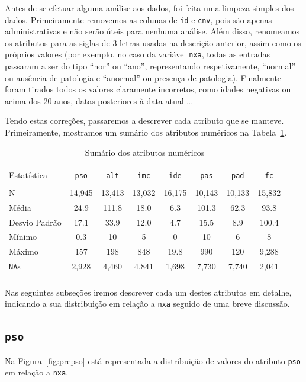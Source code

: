 \documentclass[10pt, conference, compsocconf]{IEEEtran}
\begin{document}
Antes de se efetuar alguma análise aos dados, foi feita uma limpeza
simples dos dados. Primeiramente removemos as colunas de {\tt id} e
{\tt cnv}, pois são apenas administrativas e não serão úteis para
nenhuma análise. Além disso, renomeamos os atributos para as siglas de
3 letras usadas na descrição anterior, assim como os próprios valores
(por exemplo, no caso da variável {\tt nxa}, todas as entradas
passaram a ser do tipo ``nor'' ou ``ano'', representando
respetivamente, ``normal'' ou ausência de patologia e ``anormal'' ou
presença de patologia). Finalmente foram tirados todos os valores
claramente incorretos, como idades negativas ou acima dos 20 anos,
datas posteriores à data atual \ldots

Tendo estas correções, passaremos a descrever cada atributo que se
manteve. Primeiramente, mostramos um sumário dos atributos numéricos
na Tabela~\ref{tab:nua}.

\begin{table}[!ht] \centering 
  \caption{Sumário dos atributos numéricos}
  \label{tab:nua} 
  \begin{tabular}{@{\extracolsep{5pt}}lccccccc} 
    \\[-1.8ex]\hline 
    \hline \\[-1.8ex] 
    Estatística & {\tt pso} & {\tt alt} & {\tt imc} & {\tt ide} & {\tt pas} & {\tt pad} & {\tt fc} \\ 
    \hline \\[-1.8ex] 
    N & 14,945 & 13,413 & 13,032 & 16,175 & 10,143 & 10,133 & 15,832 \\ 
    Média & 24.9 & 111.8 & 18.0 & 6.3 & 101.3 & 62.3 & 93.8 \\ 
    Desvio Padrão & 17.1 & 33.9 & 12.0 & 4.7 & 15.5 & 8.9 & 100.4 \\ 
    Mínimo & 0.3 & 10 & 5 & 0 & 10 & 6 & 8 \\ 
    Máximo & 157 & 198 & 848 & 19.8 & 990 & 120 & 9,288 \\ 
    {\tt NA}s & 2,928 & 4,460 & 4,841 & 1,698 & 7,730 & 7,740 & 2,041\\
    \hline \\[-1.8ex] 
  \end{tabular}
\end{table}

Nas seguintes subseções iremos descrever cada um destes atributos em
detalhe, indicando a sua distribuição em relação a {\tt nxa} seguido
de uma breve discussão.

\subsection{\texttt{pso}}
Na Figura~\ref{fig:prepso} está representada a distribuição de valores
do atributo {\tt pso} em relação a {\tt nxa}.
\end{document}
